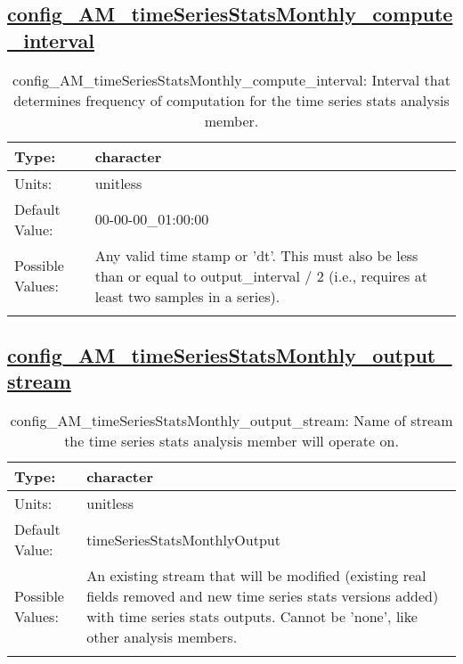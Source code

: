 \subsection[config\_AM\_timeSeriesStatsMonthly\_compute\_interval]{\hyperref[sec:nm_tab_AM_timeSeriesStatsMonthly]{config\_AM\_timeSeriesStatsMonthly\_compute\_interval}}
\label{subsec:nm_sec_config_AM_timeSeriesStatsMonthly_compute_interval}
\begin{center}
\begin{longtable}{| p{2.0in} || p{4.0in} |}
    \hline
    Type: & character \\
    \hline
    Units: & \si{unitless} \\
    \hline
    Default Value: & 00-00-00\_01:00:00 \\
    \hline
    Possible Values: & Any valid time stamp or 'dt'. This must also be less than or equal to output\_interval / 2 (i.e., requires at least two samples in a series). \\
    \hline
    \caption{config\_AM\_timeSeriesStatsMonthly\_compute\_interval: Interval that determines frequency of computation for the time series stats analysis member.}
\end{longtable}
\end{center}
\subsection[config\_AM\_timeSeriesStatsMonthly\_output\_stream]{\hyperref[sec:nm_tab_AM_timeSeriesStatsMonthly]{config\_AM\_timeSeriesStatsMonthly\_output\_stream}}
\label{subsec:nm_sec_config_AM_timeSeriesStatsMonthly_output_stream}
\begin{center}
\begin{longtable}{| p{2.0in} || p{4.0in} |}
    \hline
    Type: & character \\
    \hline
    Units: & \si{unitless} \\
    \hline
    Default Value: & timeSeriesStatsMonthlyOutput \\
    \hline
    Possible Values: & An existing stream that will be modified (existing real fields removed and new time series stats versions added) with time series stats outputs. Cannot be 'none', like other analysis members. \\
    \hline
    \caption{config\_AM\_timeSeriesStatsMonthly\_output\_stream: Name of stream the time series stats analysis member will operate on.}
\end{longtable}
\end{center}

